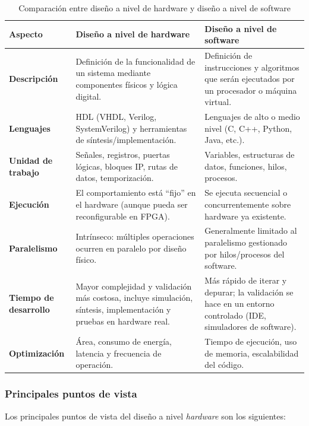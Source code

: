 \begin{table}[H]
\centering
\caption{Comparación entre diseño a nivel de hardware y diseño a nivel de software}
\begin{tabular}{|p{4cm}|p{5.5cm}|p{5.5cm}|}
\hline
\textbf{Aspecto} & \textbf{Diseño a nivel de hardware} & \textbf{Diseño a nivel de software} \\ \hline
\textbf{Descripción} & Definición de la funcionalidad de un sistema mediante componentes físicos y lógica digital. & Definición de instrucciones y algoritmos que serán ejecutados por un procesador o máquina virtual. \\ \hline
\textbf{Lenguajes} & HDL (VHDL, Verilog, SystemVerilog) y herramientas de síntesis/implementación. & Lenguajes de alto o medio nivel (C, C++, Python, Java, etc.). \\ \hline
\textbf{Unidad de trabajo} & Señales, registros, puertas lógicas, bloques IP, rutas de datos, temporización. & Variables, estructuras de datos, funciones, hilos, procesos. \\ \hline
\textbf{Ejecución} & El comportamiento está “fijo” en el hardware (aunque pueda ser reconfigurable en FPGA). & Se ejecuta secuencial o concurrentemente sobre hardware ya existente. \\ \hline
\textbf{Paralelismo} & Intrínseco: múltiples operaciones ocurren en paralelo por diseño físico. & Generalmente limitado al paralelismo gestionado por hilos/procesos del software. \\ \hline
\textbf{Tiempo de desarrollo} & Mayor complejidad y validación más costosa, incluye simulación, síntesis, implementación y pruebas en hardware real. & Más rápido de iterar y depurar; la validación se hace en un entorno controlado (IDE, simuladores de software). \\ \hline
\textbf{Optimización} & Área, consumo de energía, latencia y frecuencia de operación. & Tiempo de ejecución, uso de memoria, escalabilidad del código. \\ \hline
\end{tabular}
\label{tbl:compHWSW}
\end{table}

\subsubsection{Principales puntos de vista}

Los principales puntos de vista del diseño a nivel \textit{hardware} son los siguientes:

